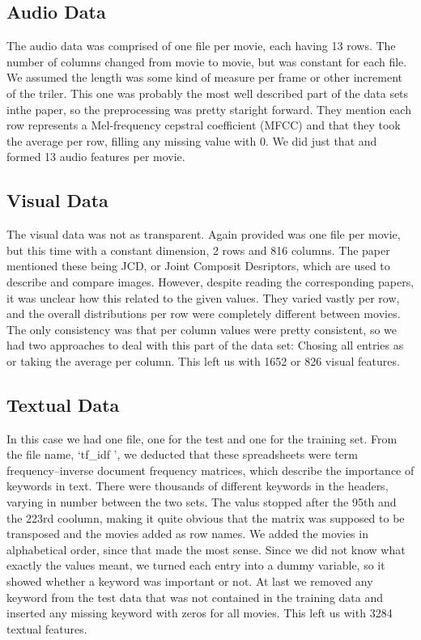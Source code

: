 \documentclass[sigconf]{acmart}
\begin{document}
\subsection{Audio Data}
The audio data was comprised of one file per movie, each having 13 rows. The number of columns changed from movie to movie, but was constant for each file. We assumed the length was some kind of measure per frame or other increment of the triler. This one was probably the most well described part of the data sets inthe paper, so the preprocessing was pretty staright forward. They mention each row represents a Mel-frequency cepstral coefficient (MFCC) and that they took the average per row, filling any missing value with 0. We did just that and formed 13 audio features per movie.

\subsection{Visual Data}
The visual data was not as transparent. Again provided was one file per movie, but this time with a constant dimension, 2 rows and 816 columns. The paper mentioned these being JCD, or Joint Composit Desriptors, which are used to describe and compare images. However, despite reading the corresponding papers, it was unclear how this related to the given values. They varied vastly per row, and the overall distributions per row were completely different between movies. The only consistency was that per column values were pretty consistent, so we had two approaches to deal with this part of the data set: Chosing all entries as or taking the average per column. This left us with 1652 or 826 visual features.  

\subsection{Textual Data}
In this case we had one file, one for the test and one for the training set. From the file name, \lq tf\_idf \rq, we deducted that these spreadsheets were term frequency–inverse document frequency matrices, which describe the importance of keywords in text. There were thousands of different keywords in the headers, varying in number between the two sets. The valus stopped after the 95th and the 223rd coolumn, making it quite obvious that the matrix was supposed to be transposed and the movies added as row names. We added the movies in alphabetical order, since that made the most sense. Since we did not know what exactly the values meant, we turned each entry into a dummy variable, so it showed whether a keyword was important or not. At last we removed any keyword from the test data that was not contained in the training data and inserted any missing keyword with zeros for all movies. This left us with 3284 textual features.
\end{document}
